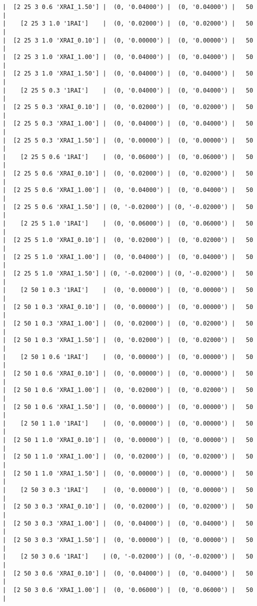 \documentclass{article}
\begin{document}
\begin{verbatim}
|  [2 25 3 0.6 'XRAI_1.50'] |  (0, '0.04000') |  (0, '0.04000') |   50  |
|    [2 25 3 1.0 '1RAI']    |  (0, '0.02000') |  (0, '0.02000') |   50  |
|  [2 25 3 1.0 'XRAI_0.10'] |  (0, '0.00000') |  (0, '0.00000') |   50  |
|  [2 25 3 1.0 'XRAI_1.00'] |  (0, '0.04000') |  (0, '0.04000') |   50  |
|  [2 25 3 1.0 'XRAI_1.50'] |  (0, '0.04000') |  (0, '0.04000') |   50  |
|    [2 25 5 0.3 '1RAI']    |  (0, '0.04000') |  (0, '0.04000') |   50  |
|  [2 25 5 0.3 'XRAI_0.10'] |  (0, '0.02000') |  (0, '0.02000') |   50  |
|  [2 25 5 0.3 'XRAI_1.00'] |  (0, '0.04000') |  (0, '0.04000') |   50  |
|  [2 25 5 0.3 'XRAI_1.50'] |  (0, '0.00000') |  (0, '0.00000') |   50  |
|    [2 25 5 0.6 '1RAI']    |  (0, '0.06000') |  (0, '0.06000') |   50  |
|  [2 25 5 0.6 'XRAI_0.10'] |  (0, '0.02000') |  (0, '0.02000') |   50  |
|  [2 25 5 0.6 'XRAI_1.00'] |  (0, '0.04000') |  (0, '0.04000') |   50  |
|  [2 25 5 0.6 'XRAI_1.50'] | (0, '-0.02000') | (0, '-0.02000') |   50  |
|    [2 25 5 1.0 '1RAI']    |  (0, '0.06000') |  (0, '0.06000') |   50  |
|  [2 25 5 1.0 'XRAI_0.10'] |  (0, '0.02000') |  (0, '0.02000') |   50  |
|  [2 25 5 1.0 'XRAI_1.00'] |  (0, '0.04000') |  (0, '0.04000') |   50  |
|  [2 25 5 1.0 'XRAI_1.50'] | (0, '-0.02000') | (0, '-0.02000') |   50  |
|    [2 50 1 0.3 '1RAI']    |  (0, '0.00000') |  (0, '0.00000') |   50  |
|  [2 50 1 0.3 'XRAI_0.10'] |  (0, '0.00000') |  (0, '0.00000') |   50  |
|  [2 50 1 0.3 'XRAI_1.00'] |  (0, '0.02000') |  (0, '0.02000') |   50  |
|  [2 50 1 0.3 'XRAI_1.50'] |  (0, '0.02000') |  (0, '0.02000') |   50  |
|    [2 50 1 0.6 '1RAI']    |  (0, '0.00000') |  (0, '0.00000') |   50  |
|  [2 50 1 0.6 'XRAI_0.10'] |  (0, '0.00000') |  (0, '0.00000') |   50  |
|  [2 50 1 0.6 'XRAI_1.00'] |  (0, '0.02000') |  (0, '0.02000') |   50  |
|  [2 50 1 0.6 'XRAI_1.50'] |  (0, '0.00000') |  (0, '0.00000') |   50  |
|    [2 50 1 1.0 '1RAI']    |  (0, '0.00000') |  (0, '0.00000') |   50  |
|  [2 50 1 1.0 'XRAI_0.10'] |  (0, '0.00000') |  (0, '0.00000') |   50  |
|  [2 50 1 1.0 'XRAI_1.00'] |  (0, '0.02000') |  (0, '0.02000') |   50  |
|  [2 50 1 1.0 'XRAI_1.50'] |  (0, '0.00000') |  (0, '0.00000') |   50  |
|    [2 50 3 0.3 '1RAI']    |  (0, '0.00000') |  (0, '0.00000') |   50  |
|  [2 50 3 0.3 'XRAI_0.10'] |  (0, '0.02000') |  (0, '0.02000') |   50  |
|  [2 50 3 0.3 'XRAI_1.00'] |  (0, '0.04000') |  (0, '0.04000') |   50  |
|  [2 50 3 0.3 'XRAI_1.50'] |  (0, '0.00000') |  (0, '0.00000') |   50  |
|    [2 50 3 0.6 '1RAI']    | (0, '-0.02000') | (0, '-0.02000') |   50  |
|  [2 50 3 0.6 'XRAI_0.10'] |  (0, '0.04000') |  (0, '0.04000') |   50  |
|  [2 50 3 0.6 'XRAI_1.00'] |  (0, '0.06000') |  (0, '0.06000') |   50  |

\end{verbatim}
\end{document}
